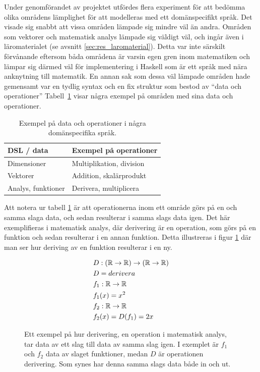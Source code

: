 \begin{draft}
Under genomförandet av projektet utfördes flera experiment för att bedömma olika
områdens lämplighet för att modelleras med ett domänspecifikt språk. Det visade
sig snabbt att vissa områden lämpade sig mindre väl än andra. Områden
som vektorer och matematisk analys lämpade sig väldigt väl, och ingår även i läromaterialet (se avsnitt \ref{sec:res_laromaterial}). Detta var inte
särskilt förvånande eftersom båda områdena är varsin egen gren inom matematiken
och lämpar sig därmed väl för implementering i Haskell som är ett språk med nära
anknytning till matematik. En annan sak som dessa väl lämpade områden hade
gemensamt var en tydlig syntax och en fix struktur som bestod av ``data och
operationer'' Tabell~\ref{tab:data_och_ops} visar några exempel på områden med
sina data och operationer.

\begin{table}[tph]
\centering
\caption{Exempel på data och operationer i några domänspecifika språk.}
\label{tab:data_och_ops}
\begin{tabular}{@{}l|l@{}}
\toprule
DSL / data & Exempel på operationer \\ \midrule
Dimensioner & Multiplikation, division \\
Vektorer & Addition, skalärprodukt \\
Analys, funktioner & Derivera, multiplicera \\ \bottomrule
\end{tabular}
\end{table}

Att notera ur tabell \ref{tab:data_och_ops} är att operationerna inom ett område görs på en och samma slaga data, och sedan resulterar i samma slags data igen. Det här exemplifieras i matematisk analys, där derivering är en operation, som görs på en funktion och sedan resulterar i en annan funktion. Detta illustreras i figur \ref{fig:analys_op_exempel} där man ser hur deriving av en funktion resulterar i en ny.

\begin{figure}[tph]
\begin{mdframed}
  \vspace{-0.5cm}
\begin{align*}
  &D : (\mathbb{R} \rightarrow \mathbb{R}) \rightarrow (\mathbb{R} \rightarrow \mathbb{R}) \\
  &D = derivera \\
  &f_1 : \mathbb{R} \rightarrow \mathbb{R} \\
  &f_1(x) = x^2 \\
  &f_2 : \mathbb{R} \rightarrow \mathbb{R} \\
  &f_2(x) = D(f_1) = 2x
\end{align*}
\end{mdframed}
\caption{Ett exempel på hur derivering, en operation i matematisk analys, tar data av ett slag till data av samma slag igen. I exemplet är $f_1$ och $f_2$ data av slaget funktioner, medan $D$ är operationen derivering. Som synes har denna samma slags data både in och ut.}
\label{fig:analys_op_exempel}
\end{figure}


\end{draft}
